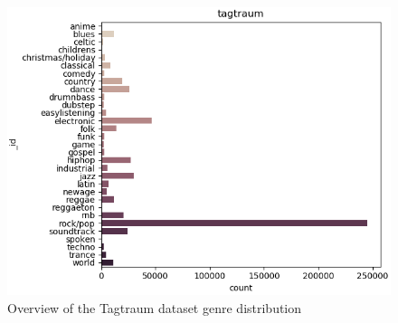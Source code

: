 \begin{figure}[!htb]
    \centering
    \includegraphics[width=1.0\textwidth]{Figures/tagtraum_dist.png}
    \decoRule
    \caption[Tagtraum distribution]{Overview of the Tagtraum dataset genre distribution}
    \label{fig:tagtraumdistfig}
\end{figure}
